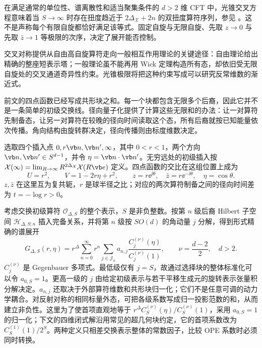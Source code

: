 在满足通常的单位性、谱离散性和适当聚集条件的 $d>2$ 维 CFT 中，光锥交叉方程意味着当 $S\to\infty$ 时存在扭度趋近于 $2\Delta_\mathcal X+2n$ 的双扭度算符序列，参见 \cite{ghs-komargodski,ghs-fitzpatrick}。这不是声称每个有限自旋都恰好满足该等式。固定自旋与无限自旋、先取 $z\to0$ 与先取 $\bar z\to1$ 等极限的次序，决定了展开能否控制。

交叉对称提供从自由高自旋算符走向一般相互作用理论的关键途径：自由理论给出精确的整座短表示塔；一般理论虽不能再用 Wick 定理构造所有态，却依旧受无限自旋处的交叉通道奇异性约束。光锥极限将把这种约束写成可以研究反常维数的渐近式。


前文的四点函数已经写成共形块之和。每一个块都包含无限多个后裔，因此它并不是一条简单的初级交换线。径向量子化提供了计算这些无限和的办法：让一对算符先制备态，让另一对算符在较晚的径向时间读取这个态，所有后裔就按已知能量依次传播。角向结构由旋转群决定，径向传播则由标度维数决定。


选取四个插入点 $0,r\vb n,\vb n',\infty$，其中 $0<r<1$，两个方向 $\vb n,\vb n'\in S^{d-1}$，并令 $\eta=\vb n\cdot\vb n'$。无穷远处的初级插入按 $\mathcal X(\infty)=\lim_{R\to\infty}R^{2\Delta_{\mathcal X}}\mathcal X(R\vb e)$ 定义。四点函数的交比在这组位置上成为
\begin{equation}\label{eq:ghs-radial-fourpoint-crossratios}
 U=r^2,\qquad V=1-2r\eta+r^2,
 \qquad z=r\ee^{\ii\theta},\quad \bar z=r\ee^{-\ii\theta},\quad\eta=\cos\theta.
\end{equation}
$z,\bar z$ 在这里互为复共轭，$r$ 是球半径之比；对应的两次算符制备之间的径向时间差为 $t=-\log r>0$。

考虑交换初级算符 $\mathcal O_{\Delta,S}$ 的整个表示，$S$ 是非负整数。按第 $n$ 级后裔 Hilbert 子空间 $\mathcal H_{\Delta,S;n}$ 插入完备关系，并将第 $n$ 级按 $SO(d)$ 的角动量 $j$ 分解，得到形式精确的谱展开
\begin{equation}\label{eq:ghs-radial-block-expansion}
 G_{\Delta,S}(r,\eta)
 =r^{\Delta}\sum_{n=0}^{\infty}r^n
 \sum_{j\in\mathcal J_n}a_{n,j}
 \frac{C_j^{(\nu)}(\eta)}{C_j^{(\nu)}(1)},
 \qquad \nu=\frac{d-2}{2},\quad d>2.
\end{equation}
$C_j^{(\nu)}$ 是 Gegenbauer 多项式。最低级仅有 $j=S$，故通过选择块的整体标准化可以令 $a_{0,S}=1$。更高一级的 $j$ 由给定初级表示与若干平移生成元的旋转表示张量积分解决定。$a_{n,j}$ 还取决于外部算符维数和共形块归一化；它们不是任意可调的动力学耦合。对反射对称的相同标量外态，可把各级系数写成归一投影范数的和，从而建立非负性。这里为了使首项直观地等于 $r^\Delta C_S^{(\nu)}(\eta)/C_S^{(\nu)}(1)$，采用 $a_{0,S}=1$ 的归一化；下文的四维闭式解沿用常见的超几何块约定，它的首项系数改为 $C_S^{(1)}(1)/2^S$。两种定义只相差交换表示整体的常数因子，比较 OPE 系数时必须同时转换。

